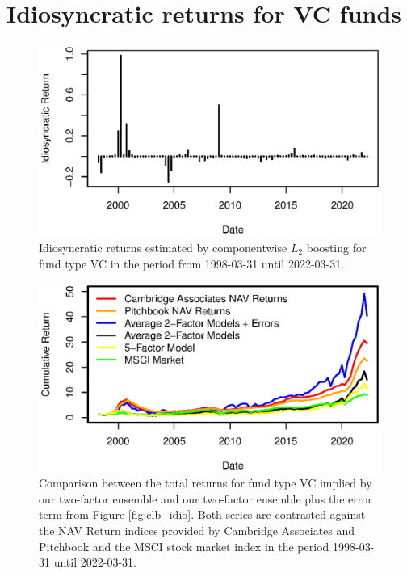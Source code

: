 \clearpage

\appendix

\section{Idiosyncratic returns for VC funds}
\label{sec:vc_errors}




\begin{figure}[H]
	\centering
	\includegraphics{Figures/XErrorSeriesVC}
	\caption{Idiosyncratic returns estimated by componentwise $L_2$ boosting for fund type VC in the period from 1998-03-31 until 2022-03-31.}
	\label{fig:clb_idio_vc}
\end{figure}

\begin{figure}[H]
	\centering
	\includegraphics{Figures/XTotalErrorSeriesVC}
	\caption{
		Comparison between the total returns for fund type VC implied by our two-factor ensemble and our two-factor ensemble plus the error term from Figure \ref{fig:clb_idio}.
		Both series are contrasted against the NAV Return indices provided by Cambridge Associates and Pitchbook and the MSCI stock market index in the period 1998-03-31 until 2022-03-31.
	}
	\label{fig:clb_total_vc}
\end{figure}

